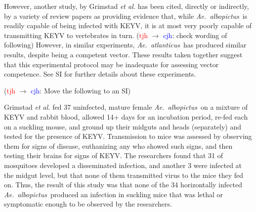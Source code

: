 \documentclass[12pt]{article}
\newcommand{\alb}{\textit{Ae.\ albopictus}}
\newcommand{\atl}{\textit{Ae.\ atlanticus}}
\newcommand{\cjh}{\textcolor{blue}{cjh}}
\newcommand{\tjh}{\textcolor{red}{tjh}}
\newcommand{\msg}[3]{(#1 $\rightarrow$ #2: #3)}
\newcommand{\mtc}[1]{\msg\tjh\cjh{#1}}
\begin{document}
            However, another study, by Grimstad \textit{et al.} \cite{grimstad1989recently} has been cited, directly or indirectly, by a variety of review papers\cite{asdf,asdf} as providing evidence that, while \alb\ is readily capable of being infected with KEYV, it is at most very poorly capable of transmitting KEYV to vertebrates in turn. \mtc{ check wording of following} However, in similar experiments, \atl\ has produced similar results, despite being a competent vector.  These results taken together suggest that this experimental protocol may be inadequate for assessing vector competence.  See SI for further details about these experiments.
            
        \mtc{Move the following to an SI}

        Grimstad \textit{et al.} fed 37 uninfected, mature female \alb\ on a mixture of KEYV and rabbit blood, allowed 14+ days for an incubation period, re-fed each on a suckling mouse, and ground up their midguts and heads (separately) and tested for the presence of KEYV. Transmission to mice was assessed by observing them for signs of disease, euthanizing any who showed such signs, and then testing their brains for signs of KEYV. The researchers found that 31 of mosquitoes developed a disseminated infection, and another 3 were infected at the midgut level, but that none of them transmitted virus to the mice they fed on. Thus, the result of this study was that none of the 34 horizontally infected \alb\ produced an infection in suckling mice that was lethal or symptomatic enough to be observed by the researchers.
\end{document}
